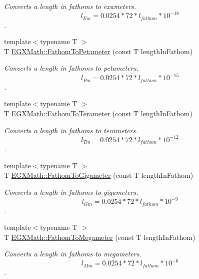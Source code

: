 \begin{DoxyCompactItemize}
\begin{DoxyCompactList}\small\item\em Converts a length in fathoms to exameters. \[ l_{Em}=0.0254 * 72 * l_{fathom} * 10^{-18} \]. \end{DoxyCompactList}\item 
{\footnotesize template$<$typename T $>$ }\\T \mbox{\hyperlink{group___e_g_x_math-_conversions-_length_conversions-_imperial-_fathom-_s_i_ga1b39213b85524f677fed7b3d5a7052ce}{E\+G\+X\+Math\+::\+Fathom\+To\+Petameter}} (const T length\+In\+Fathom)
\begin{DoxyCompactList}\small\item\em Converts a length in fathoms to petameters. \[ l_{Pm}=0.0254 * 72 * l_{fathom} * 10^{-15} \]. \end{DoxyCompactList}\item 
{\footnotesize template$<$typename T $>$ }\\T \mbox{\hyperlink{group___e_g_x_math-_conversions-_length_conversions-_imperial-_fathom-_s_i_gade17d568b89bc6b268ca6acb38ca8863}{E\+G\+X\+Math\+::\+Fathom\+To\+Terameter}} (const T length\+In\+Fathom)
\begin{DoxyCompactList}\small\item\em Converts a length in fathoms to terameters. \[ l_{Tm}=0.0254 * 72 * l_{fathom} * 10^{-12} \]. \end{DoxyCompactList}\item 
{\footnotesize template$<$typename T $>$ }\\T \mbox{\hyperlink{group___e_g_x_math-_conversions-_length_conversions-_imperial-_fathom-_s_i_gacba836a61d9d2c6ad72195c06fab3f41}{E\+G\+X\+Math\+::\+Fathom\+To\+Gigameter}} (const T length\+In\+Fathom)
\begin{DoxyCompactList}\small\item\em Converts a length in fathoms to gigameters. \[ l_{Gm}=0.0254 * 72 * l_{fathom} * 10^{-9} \]. \end{DoxyCompactList}\item 
{\footnotesize template$<$typename T $>$ }\\T \mbox{\hyperlink{group___e_g_x_math-_conversions-_length_conversions-_imperial-_fathom-_s_i_ga143cda5a2c5c3914831736330058809b}{E\+G\+X\+Math\+::\+Fathom\+To\+Megameter}} (const T length\+In\+Fathom)
\begin{DoxyCompactList}\small\item\em Converts a length in fathoms to megameters. \[ l_{Mm}=0.0254 * 72 * l_{fathom} * 10^{-6} \]. \end{DoxyCompactList}\item 

\end{DoxyCompactItemize}
